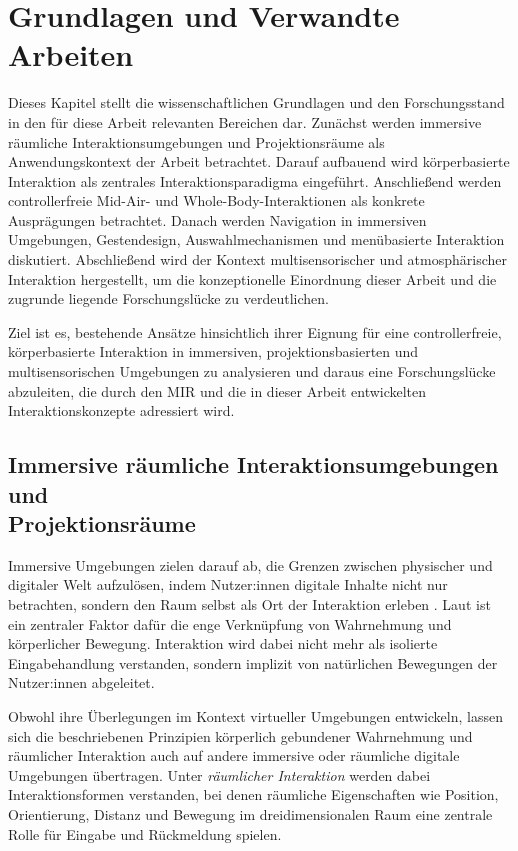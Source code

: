 \section{Grundlagen und Verwandte Arbeiten}
\label{sec:rw}
Dieses Kapitel stellt die wissenschaftlichen Grundlagen und den Forschungsstand in den für diese Arbeit relevanten Bereichen dar. Zunächst werden immersive räumliche Interaktionsumgebungen und Projektionsräume als Anwendungskontext der Arbeit betrachtet. Darauf aufbauend wird körper\-basierte Interaktion als zentrales Interaktionsparadigma eingeführt. Anschließend werden controllerfreie Mid-Air- und Whole-Body-Interaktionen als konkrete Ausprägungen betrachtet. Danach werden Navigation in immersiven Umgebungen, Gestendesign, Auswahlmechanismen und menübasierte Interaktion diskutiert. Abschließend wird der Kontext multisensorischer und atmosphärischer Interaktion hergestellt, um die konzeptionelle Einordnung dieser Arbeit und die zugrunde liegende Forschungslücke zu verdeutlichen.

Ziel ist es, bestehende Ansätze hinsichtlich ihrer Eignung für eine controllerfreie, körper\-basierte Interaktion in immersiven, projektionsbasierten und multisensorischen Umgebungen zu analysieren und daraus eine Forschungslücke abzuleiten, die durch den MIR und die in dieser Arbeit entwickelten Interaktionskonzepte adressiert wird.


\subsection[Immersive räumliche Interaktionsumgebungen und Projektionsräume]{Immersive räumliche Interaktionsumgebungen und\protect\\\mbox{Projektionsräume}}
\label{sec:rw_spatial}

Immersive Umgebungen zielen darauf ab, die Grenzen zwischen physischer und digitaler Welt aufzulösen, indem Nutzer:innen digitale Inhalte nicht nur betrachten, sondern den Raum selbst als Ort der Interaktion erleben \parencite{slater1997frameworkForImmersiveVirtualEnvironments}. Laut \textcite{slater1997frameworkForImmersiveVirtualEnvironments} ist ein zentraler Faktor dafür die enge Verknüpfung von Wahrnehmung und körperlicher Bewegung. Interaktion wird dabei nicht mehr als isolierte Eingabehandlung verstanden, sondern implizit von natürlichen Bewegungen der Nutzer:innen abgeleitet. %

Obwohl \textcite{slater1997frameworkForImmersiveVirtualEnvironments} ihre Überlegungen im Kontext virtueller Umgebungen entwickeln, lassen sich die beschriebenen Prinzipien körperlich gebundener Wahrnehmung und räum\-licher Interaktion auch auf andere immersive oder räumliche digitale Umgebungen übertragen. Unter \textit{räum\-licher Interaktion} werden dabei Interaktionsformen verstanden, bei denen räumliche Eigenschaften wie Position, Orientierung, Distanz und Bewegung im dreidimensionalen Raum eine zentrale Rolle für Eingabe und Rückmeldung spielen.

